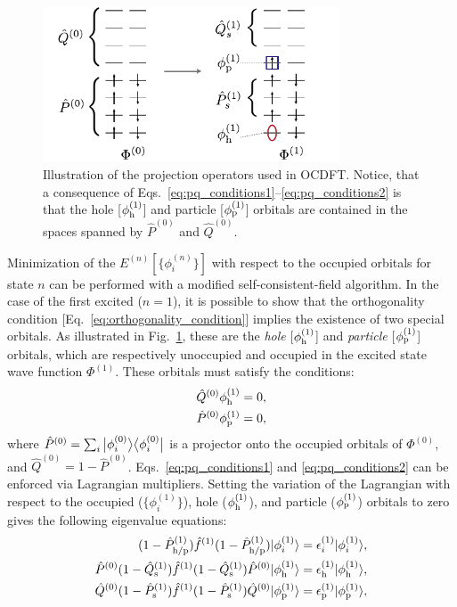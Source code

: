\documentclass{article}
\begin{document}
\begin{figure}
\centering
\includegraphics[width=8.8cm]{Figure1.pdf}
\caption{Illustration of the projection operators used in OCDFT.
Notice, that a consequence of Eqs.~\eqref{eq:pq_conditions1}--\eqref{eq:pq_conditions2} is that the hole [$\phi^{(1)}_{\rm h}$] and particle [$\phi^{(1)}_{\rm p}$] orbitals are contained in the spaces spanned by $\hat{P}^{(0)}$ and $\hat{Q}^{(0)}$.}
\label{fig:projection}
\end{figure}
Minimization of the $E^{(n)}[\{\phi^{(n)}_i\}]$ with respect to the occupied orbitals for state $n$ can be performed with a modified self-consistent-field algorithm.\cite{evangelista_orthogonality_2013}
In the case of the first excited ($n = 1$), it is possible to show that the orthogonality condition [Eq.~\eqref{eq:orthogonality_condition}] implies the existence of two special orbitals.
As illustrated in Fig.~\ref{fig:projection}, these are the \textit{hole} [$\phi^{(1)}_{\rm h}$] and \textit{particle} [$\phi^{(1)}_{\rm p}$] orbitals, which are respectively unoccupied and occupied in the excited state wave function $\Phi^{(1)}$.
These orbitals must satisfy the conditions:
\begin{align}
\label{eq:pq_conditions1}
\hat{Q}^{(0)}\phi_{\rm h}^{(1)} = 0,\\
\label{eq:pq_conditions2}
\hat{P}^{(0)}\phi_{\rm p}^{(1)} = 0,
\end{align}
where $\hat{P}^{(0)} = \sum_{i} \ket[1]{\phi_i^{(0)}}\bra[1]{\phi_i^{(0)}}$ is a projector onto the occupied orbitals of $\Phi^{(0)}$, and $\hat{Q}^{(0)} = 1 - \hat{P}^{(0)}$.
Eqs.~\eqref{eq:pq_conditions1} and \eqref{eq:pq_conditions2} can be enforced via Lagrangian multipliers.
Setting the variation of the Lagrangian with respect to the occupied ($\{\phi^{(1)}_i\}$), hole ($\phi^{(1)}_{\rm h}$), and particle ($\phi^{(1)}_{\rm p}$) orbitals to zero gives the following eigenvalue equations:
\begin{align}
\label{eq:one_state_occ_eq}
(1 - \hat{P}^{(1)}_{\rm h/p})\hat{f}^{(1)} (1 - \hat{P}^{(1)}_{\rm h/p})|\phi_i^{(1)}\rangle &= \epsilon^{(1)}_i |\phi_i^{(1)}\rangle,\\
\label{eq:one_state_hole_eq}
\hat{P}^{(0)}(1-\hat{Q}_{\rm s}^{(1)}) \hat{f}^{(1)} (1-\hat{Q}_{\rm s}^{(1)})\hat{P}^{(0)} |\phi_{\rm h}^{(1)}\rangle &= \epsilon^{(1)}_{\rm h} |\phi_{\rm h}^{(1)}\rangle,\\
\label{eq:one_state_part_eq}
\hat{Q}^{(0)}(1-\hat{P}_{\rm s}^{(1)}) \hat{f}^{(1)} (1-\hat{P}_{\rm s}^{(1)}) \hat{Q}^{(0)}|\phi_{\rm p}^{(1)}\rangle &= \epsilon^{(1)}_{\rm p} |\phi_{\rm p}^{(1)}\rangle,
\end{align}
\end{document}
